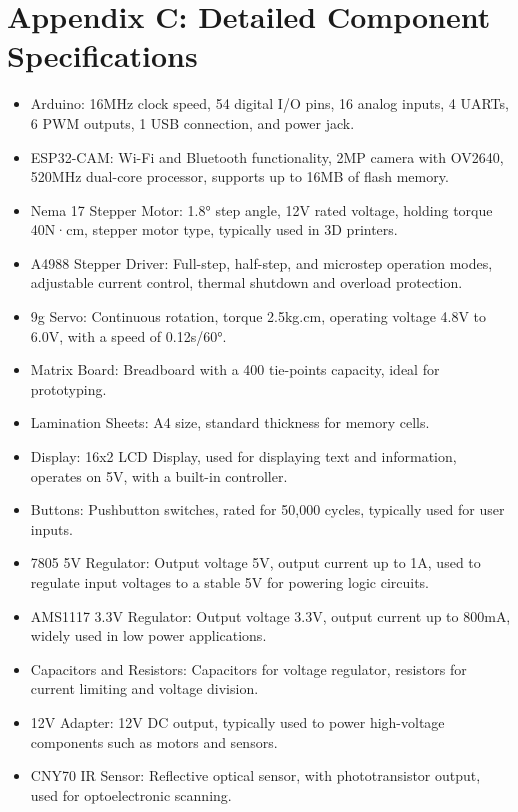 \newpage

\section*{Appendix C: Detailed Component Specifications}
\begin{itemize}
    \item Arduino: 16MHz clock speed, 54 digital I/O pins, 16 analog inputs, 4 UARTs, 6 PWM outputs, 1 USB connection, and power jack.
    \item ESP32-CAM: Wi-Fi and Bluetooth functionality, 2MP camera with OV2640, 520MHz dual-core processor, supports up to 16MB of flash memory.
    \item Nema 17 Stepper Motor: 1.8° step angle, 12V rated voltage, holding torque 40N·cm, stepper motor type, typically used in 3D printers.
    \item A4988 Stepper Driver: Full-step, half-step, and microstep operation modes, adjustable current control, thermal shutdown and overload protection.
    \item 9g Servo: Continuous rotation, torque 2.5kg.cm, operating voltage 4.8V to 6.0V, with a speed of 0.12s/60°.
    \item Matrix Board: Breadboard with a 400 tie-points capacity, ideal for prototyping.
    \item Lamination Sheets: A4 size, standard thickness for memory cells.
    \item Display: 16x2 LCD Display, used for displaying text and information, operates on 5V, with a built-in controller.
    \item Buttons: Pushbutton switches, rated for 50,000 cycles, typically used for user inputs.
    \item 7805 5V Regulator: Output voltage 5V, output current up to 1A, used to regulate input voltages to a stable 5V for powering logic circuits.
    \item AMS1117 3.3V Regulator: Output voltage 3.3V, output current up to 800mA, widely used in low power applications.
    \item Capacitors and Resistors: Capacitors for voltage regulator, resistors for current limiting and voltage division.
    \item 12V Adapter: 12V DC output, typically used to power high-voltage components such as motors and sensors.
    \item CNY70 IR Sensor: Reflective optical sensor, with phototransistor output, used for optoelectronic scanning.
\end{itemize}



